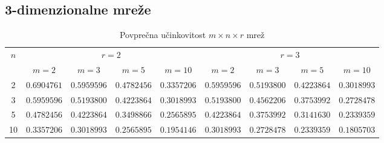 \documentclass[a4paper, 16pt]{article}
\begin{document}
    \subsection{3-dimenzionalne mreže}
    \begin{table}[!h]
        \begin{adjustwidth}{-0.7in}{-.5in}  
        \begin{center}
        \begin{tabular}{c|c|c|c|c||c|c|c|c}
            \multirow{2}{*}{$n$} & 
            \multicolumn{4}{c}{$r = 2$} & \multicolumn{4}{c}{$r = 3$}\\
               & $m=2$       & $m=3$       & $m=5$       & $m=10$      & $m = 2$     & $m = 3$    & $m=5$        & $m=10$ \\ \hline
            2  & $0.6904761$ & $0.5959596$ & $0.4782456$ & $0.3357206$ & $0.5959596$ & $0.5193800$ & $0.4223864$ & $0.3018993$\\
            3  & $0.5959596$ & $0.5193800$ & $0.4223864$ & $0.3018993$ & $0.5193800$ & $0.4562206$ & $0.3753992$ & $0.2728478$\\
            5  & $0.4782456$ & $0.4223864$ & $0.3498866$ & $0.2565895$ & $0.4223864$ & $0.3753992$ & $0.3141630$ & $0.2339359$ \\
            10 & $0.3357206$ & $0.3018993$ & $0.2565895$ & $0.1954146$ & $0.3018993$ & $0.2728478$ & $0.2339359$ & $0.1805703$\\

        \end{tabular}
        \caption{Povprečna učinkovitost $m \times n \times r$ mrež}
        \label{table: 2}
        \end{center}
        \end{adjustwidth}
    \end{table}
\end{document}
